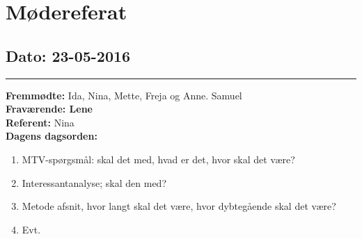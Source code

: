 \chapter{Mødereferat}

\section{Dato: 23-05-2016}
\hrule
\textbf{Fremmødte: } Ida, Nina, Mette, Freja og Anne. Samuel \\
\textbf{Fraværende: Lene} \\
\textbf{Referent: } Nina \\
\textbf{Dagens dagsorden: }
\begin{enumerate}
\item MTV-spørgsmål: skal det med, hvad er det, hvor skal det være?
\item Interessantanalyse; skal den med?
\item Metode afsnit, hvor langt skal det være, hvor dybtegående skal det være?
\item Evt.
\end{enumerate}

